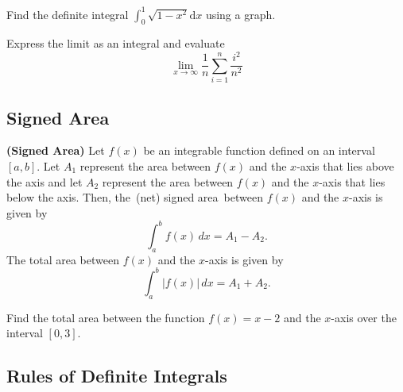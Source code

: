 


\begin{example}

Find the definite integral \(\int_0^1\sqrt{1-x^2}\mathrm{d}x\) using a
graph.

\end{example}
\vspace*{6\baselineskip}

\begin{example}

Express the limit as an integral and evaluate
\[\lim\limits_{x\to \infty}\frac{1}{n}\sum_{i=1}^n\frac{i^2}{n^2}\]

\end{example}
\vspace*{6\baselineskip}

\hypertarget{signed-area}{%
\subsection{Signed Area}\label{signed-area}}

\begin{definition}

\textbf{(Signed Area)} Let \(f(x)\) be an integrable function defined on
an interval \([a,b]\). Let \(A_1\) represent the area between \(f(x)\)
and the \(x\)-axis that lies above the axis and let \(A_2\) represent
the area between \(f(x)\) and the \(x\)-axis that lies below the axis.
Then, the~(net) signed area~between \(f(x)\) and the \(x\)-axis is given
by \[\int^b_af(x)\,dx=A_1 - A_2.\] The total area between \(f(x)\) and the
\(x\)-axis is given by \[\int^b_a|f(x)|\,dx=A_1+A_2.\]

\end{definition}

\begin{example}

Find the total area between the function \(f(x)=x-2\) and the \(x\)-axis
over the interval \([0,3]\).

\end{example}
\vspace*{6\baselineskip}

\hypertarget{rules-of-definite-integrals}{%
\subsection{Rules of Definite
Integrals}\label{rules-of-definite-integrals}}

